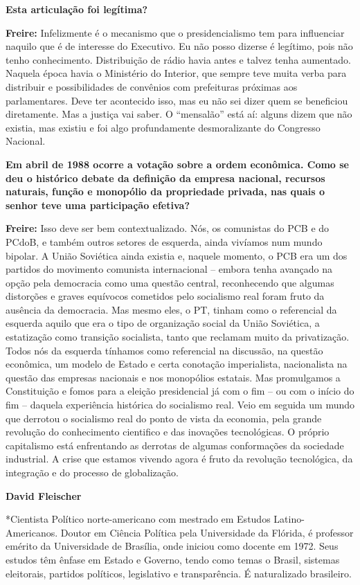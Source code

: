 \textbf{Esta articulação foi legítima?}

\textbf{Freire:} Infelizmente é o mecanismo que o presidencialismo tem
para influenciar naquilo que é de interesse do Executivo. Eu não posso
dizerse é legítimo, pois não tenho conhecimento. Distribuição de rádio
havia antes e talvez tenha aumentado. Naquela época havia o Ministério
do Interior, que sempre teve muita verba para distribuir e
possibilidades de convênios com prefeituras próximas aos parlamentares.
Deve ter acontecido isso, mas eu não sei dizer quem se beneficiou
diretamente. Mas a justiça vai saber. O ``mensalão'' está aí: alguns
dizem que não existia, mas existiu e foi algo profundamente
desmoralizante do Congresso Nacional.

\textbf{Em abril de 1988 ocorre a votação sobre a ordem econômica. Como
se deu o histórico debate da definição da empresa nacional, recursos
naturais, função e monopólio da propriedade privada, nas quais o senhor
teve uma participação efetiva?}

\textbf{Freire:} Isso deve ser bem contextualizado. Nós, os comunistas
do PCB e do PCdoB, e também outros setores de esquerda, ainda vivíamos
num mundo bipolar. A União Soviética ainda existia e, naquele momento, o
PCB era um dos partidos do movimento comunista internacional -- embora
tenha avançado na opção pela democracia como uma questão central,
reconhecendo que algumas distorções e graves equívocos cometidos pelo
socialismo real foram fruto da ausência da democracia. Mas mesmo eles, o
PT, tinham como o referencial da esquerda aquilo que era o tipo de
organização social da União Soviética, a estatização como transição
socialista, tanto que reclamam muito da privatização. Todos nós da
esquerda tínhamos como referencial na discussão, na questão econômica,
um modelo de Estado e certa conotação imperialista, nacionalista na
questão das empresas nacionais e nos monopólios estatais. Mas
promulgamos a Constituição e fomos para a eleição presidencial já com o
fim -- ou com o início do fim -- daquela experiência histórica do
socialismo real. Veio em seguida um mundo que derrotou o socialismo real
do ponto de vista da economia, pela grande revolução do conhecimento
cientifico e das inovações tecnológicas. O próprio capitalismo está
enfrentando as derrotas de algumas conformações da sociedade industrial.
A crise que estamos vivendo agora é fruto da revolução tecnológica, da
integração e do processo de globalização.

\textbf{David Fleischer}

*Cientista Político norte-americano com mestrado em Estudos
Latino-Americanos. Doutor em Ciência Política pela Universidade da
Flórida, é professor emérito da Universidade de Brasília, onde iniciou
como docente em 1972. Seus estudos têm ênfase em Estado e Governo, tendo
como temas o Brasil, sistemas eleitorais, partidos políticos,
legislativo e transparência. É naturalizado brasileiro.

